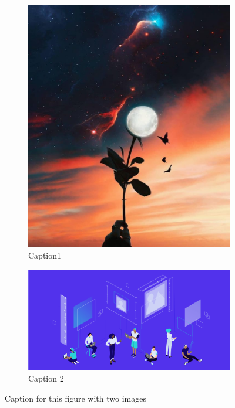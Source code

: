 \documentclass[10pt]{article}
\begin{document}
\begin{figure}[h!]
  \begin{subfigure}{0.5\textwidth}
     \centering
     \includegraphics[width=0.6\linewidth]{Imagenes/ImgEj1.jpg} 
     \caption{Caption1}
     \label{fig:subim1}
     \end{subfigure}
  \begin{subfigure}{0.5\textwidth}
     \centering
     \includegraphics[scale=0.3]{Imagenes/ImgEj2.png}
     \caption{Caption 2}
     \label{fig:subim2}
     \end{subfigure}

  \caption{Caption for this figure with two images}
  \label{fig:image2}
\end{figure}

\lipsum[7]
\end{document}
